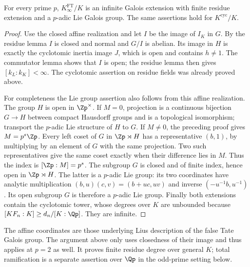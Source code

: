 \begin{lemma}
\label{ft:lie-structure}
\notready
For every prime $p$, $K^{\mathrm{FT}}_\infty/K$ is an infinite Galois
extension with finite residue extension and a $p$-adic Lie Galois group.
The same assertions hold for $K^{\mathrm{cyc}}/K$.
\end{lemma}
\begin{proof}
Use the closed affine realization and let $I$ be the image of $I_K$ in
$G$. By the residue lemma $I$ is closed and normal and $G/I$ is abelian.
Its image in $H$ is exactly the cyclotomic inertia image $J$, which is
open and contains $h\ne1$. The commutator lemma shows that $I$ is open;
the residue lemma then gives $[k_L:k_K]<\infty$.
The cyclotomic assertion on residue fields was already proved above.

For completeness the Lie group assertion also follows from this affine
realization. The group $H$ is open in $\Zp^\times$. If $M=0$, projection
is a continuous bijection $G\longrightarrow H$ between compact Hausdorff
groups and is a topological isomorphism; transport the $p$-adic Lie
structure of $H$ to $G$. If $M\ne0$, the preceding proof gives
$M=p^s\Zp$. Every left coset of $G$ in $\Zp\rtimes H$ has a
representative $(b,1)$, by multiplying by an element of $G$ with the same
projection. Two such representatives give the same coset exactly when
their difference lies in $M$. Thus the index is $[\Zp:M]=p^s$.
The subgroup $G$ is closed and of finite index, hence open in
$\Zp\rtimes H$. The latter is a $p$-adic Lie group: its two coordinates
have analytic multiplication $(b,u)(c,v)=(b+uc,uv)$ and inverse
$(-u^{-1}b,u^{-1})$. Its open subgroup $G$ is therefore a $p$-adic Lie
group. Finally both extensions contain the cyclotomic tower, whose
degrees over $K$ are unbounded because
$[KF_n:K]\geq d_n/[K:\Qp]$. They are infinite.
\end{proof}

\begin{remark}
The affine coordinates are those underlying Liu\textquotesingle s description
of the false Tate Galois group. The argument above only uses closedness
of their image and thus applies at $p=2$ as well. It proves finite
residue degree over general $K$; total ramification is a separate
assertion over $\Qp$ in the odd-prime setting below.
\end{remark}

